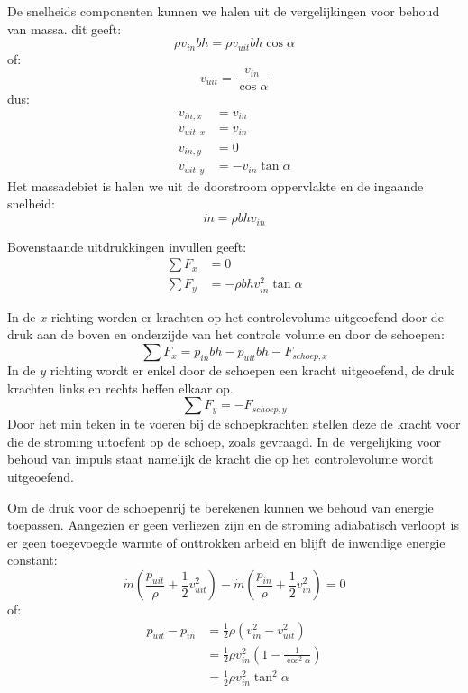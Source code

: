 \begin{voorbeeld}
	De snelheids componenten kunnen we halen uit de vergelijkingen voor behoud van massa. dit geeft:
	\begin{equation*}
		\rho v_{in} b h = \rho v_{uit} b h \cos \alpha
	\end{equation*}
	of:
	\begin{equation*}
		v_{uit} = \frac{v_{in}}{\cos \alpha}
	\end{equation*}
	dus:
	\begin{align*}
		v_{in,x}  &= v_{in}\\
		v_{uit,x} &= v_{in}\\
		v_{in,y}  &= 0\\
		v_{uit,y} &= -v_{in}\tan \alpha
	\end{align*}
	Het massadebiet is halen we uit de doorstroom oppervlakte en de ingaande snelheid:
	\begin{equation*}
		\dot{m} = \rho b h v_{in}
	\end{equation*}

	Bovenstaande uitdrukkingen invullen geeft:
	\begin{align*}
		\sum F_x &= 0 \\
		\sum F_y &= -\rho b h v_{in}^2 \tan \alpha
	\end{align*}

	In de $x$-richting worden er krachten op het controlevolume uitgeoefend door de druk aan de boven en onderzijde van het controle volume en door de schoepen:
	\begin{equation*}
		\sum F_x = p_{in} b h - p_{uit} b h - F_{schoep,x}
	\end{equation*}
	In de $y$ richting wordt er enkel door de schoepen een kracht uitgeoefend, de druk krachten links en rechts heffen elkaar op.
	\begin{equation*}
		\sum F_y = - F_{schoep,y}
	\end{equation*}
	Door het min teken in te voeren bij de schoepkrachten stellen deze de kracht voor die de stroming uitoefent op de schoep, zoals gevraagd. In de vergelijking voor behoud van impuls staat namelijk de kracht die op het controlevolume wordt uitgeoefend.

	Om de druk voor de schoepenrij te berekenen kunnen we behoud van energie toepassen. Aangezien er geen verliezen zijn en de stroming adiabatisch verloopt is er geen toegevoegde warmte of onttrokken arbeid en blijft de inwendige energie constant:
	\begin{equation*}
		\dot{m} \left(\frac{p_{uit}}{\rho} + \frac{1}{2}v^2_{uit}\right) - \dot{m} \left(\frac{p_{in}}{\rho}+ \frac{1}{2}v^2_{in} \right) = 0
	\end{equation*}
	of:
	\begin{align*}
		 p_{uit} - p_{in} &= \frac{1}{2} \rho \left(v^2_{in} - v^2_{uit} \right) \\
		                  &= \frac{1}{2} \rho v^2_{in} \left(1 - \frac{1}{\cos^2 \alpha} \right) \\
		                  &= \frac{1}{2} \rho v^2_{in} \tan^2 \alpha
	\end{align*}


\end{voorbeeld}
